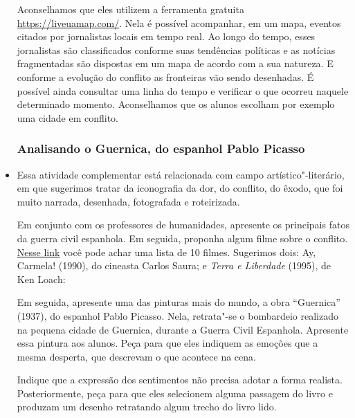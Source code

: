 \documentclass[12pt]{extarticle}
\begin{document}
\begin{itemize}

Aconselhamos que eles utilizem a ferramenta gratuita \url{https://liveuamap.com/}. 
Nela é possível acompanhar, em um mapa, eventos citados por jornalistas locais 
em tempo real. Ao longo do tempo, esses jornalistas são classificados conforme
suas tendências políticas e as notícias fragmentadas são dispostas em 
um mapa de acordo com a sua natureza. E conforme a evolução do conflito as fronteiras
vão sendo desenhadas. É possível ainda consultar uma linha do tempo e 
verificar o que ocorreu naquele determinado momento. Aconselhamos que 
os alunos escolham por exemplo uma cidade em conflito.  




\subsubsection{Analisando o Guernica, do espanhol Pablo Picasso}

\item Essa atividade complementar está relacionada com campo artístico"-literário,
em que sugerimos tratar da
iconografia da dor, do conflito, do êxodo, que foi muito narrada,
desenhada, fotografada e roteirizada. 

Em conjunto com os professores de
humanidades, apresente os principais fatos da guerra civil espanhola. 
Em seguida, proponha algum filme sobre o conflito. 
\href{https://www.brasildefato.com.br/2020/07/18/no-pasaran-10-filmes-sobre-a-guerra-civil-espanhola}{Nesse link} 
você pode achar uma lista de 10 filmes. Sugerimos dois: Ay, Carmela! (1990), 
do cineasta Carlos Saura; e  \textit{Terra e Liberdade} (1995), de Ken Loach:

Em seguida, apresente uma das pinturas mais
do mundo, a obra ``Guernica'' (1937), do espanhol Pablo Picasso. Nela,
retrata"-se o bombardeio realizado na pequena cidade de Guernica,
durante a Guerra Civil Espanhola. Apresente essa pintura aos alunos.
Peça para que eles indiquem as emoções que a mesma desperta, que
descrevam o que acontece na cena. 

Indique que a expressão dos
sentimentos não precisa adotar a forma realista. Posteriormente, peça
para que eles selecionem alguma passagem do livro e produzam um
desenho retratando algum trecho do livro lido. 



\end{itemize}
\end{document}
